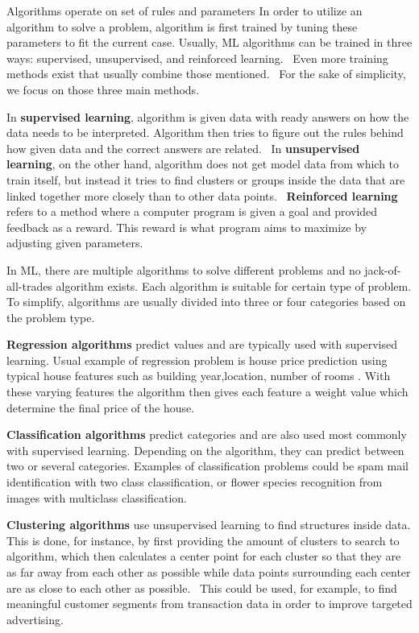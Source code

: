 Algorithms operate on set of rules and parameters
In order to utilize an algorithm to solve a problem,
algorithm is first trained by tuning these parameters
to fit the current case.
Usually,
ML algorithms can be trained in three ways:
supervised, unsupervised, and reinforced learning.~\cite{jordan2015machine}
Even more training methods exist
that usually combine those mentioned.~\cite{ayodele2010types, mahesh2020machine}
For the sake of simplicity,
we focus on those three main methods.

In \textbf{supervised learning},
algorithm is given data with ready answers on
how the data needs to be interpreted.
Algorithm then tries to figure out the rules behind
how given data and the correct answers are related.~\cite{ayodele2010types}
In \textbf{unsupervised learning},
on the other hand,
algorithm does not get model data from which to train itself,
but instead it tries to find clusters or groups inside the data
that are linked together more closely than to other data points.~\cite{winky}
\textbf{Reinforced learning} refers to a method
where a computer program is given a goal
and provided feedback as a reward.
This reward is what program aims to maximize
by adjusting given parameters.~\cite{ayodele2010types}

In ML,
there are multiple algorithms to solve different problems
and no jack-of-all-trades algorithm exists.
Each algorithm is suitable for certain type of problem.
To simplify,
algorithms are usually divided into three or four categories
based on the problem type.~\cite{vickery2019mltypes}

\textbf{Regression algorithms} predict values
and are typically used with supervised learning.
Usual example of regression problem
is house price prediction
using typical house features
such as building
year,location, number of rooms \etc.
With these varying features
the algorithm then gives each feature a weight value
which determine the final price of the house.~\cite{vickery2019mltypes}

\textbf{Classification algorithms} predict categories
and are also used most commonly with supervised learning.
Depending on the algorithm,
they can predict between two or several categories.
Examples of classification problems
could be spam mail identification with two class classification,
or flower species recognition from images with multiclass classification.~\cite{vickery2019mltypes}

\textbf{Clustering algorithms} use unsupervised learning
to find structures inside data.
This is done,
for instance,
by first providing the amount of clusters to search to algorithm,
which then calculates a center point for each cluster
so that they are as far away from each other as possible
while data points surrounding each center are as close to each other as possible.~\cite{mahesh2020machine}
This could be used,
for example,
to find meaningful customer segments from transaction data
in order to improve targeted advertising.~\cite{chen2017purtreeclust}

